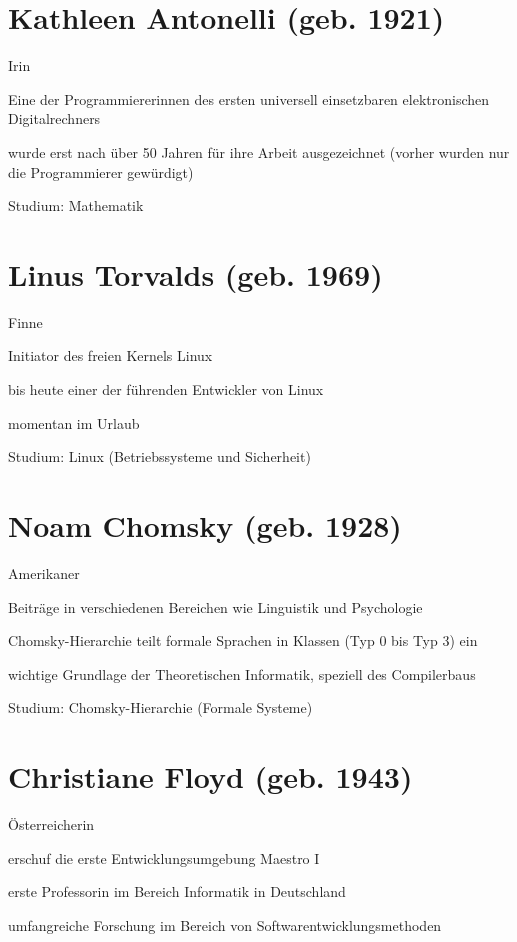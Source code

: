 \documentclass[a4paper,12pt]{report}
\begin{document}
\section*{Kathleen Antonelli (geb. 1921)}
\begin{itemize*}
    \item Irin
    \item Eine der Programmiererinnen des ersten universell einsetzbaren elektronischen Digitalrechners
    \item wurde erst nach über 50 Jahren für ihre Arbeit ausgezeichnet (vorher wurden nur die Programmierer gewürdigt)
    \item Studium: Mathematik
\end{itemize*}

\section*{Linus Torvalds (geb. 1969)}
\begin{itemize*}
    \item Finne
    \item Initiator des freien Kernels Linux
    \item bis heute einer der führenden Entwickler von Linux
    \item momentan im Urlaub
    \item Studium: Linux (Betriebssysteme und Sicherheit)
\end{itemize*}

\section*{Noam Chomsky (geb. 1928)}
\begin{itemize*}
    \item Amerikaner
    \item Beiträge in verschiedenen Bereichen wie Linguistik und Psychologie
    \item Chomsky-Hierarchie teilt formale Sprachen in Klassen (Typ 0 bis Typ 3) ein
    \item wichtige Grundlage der Theoretischen Informatik, speziell des Compilerbaus
    \item Studium: Chomsky-Hierarchie (Formale Systeme)
\end{itemize*}

\newpage

\section*{Christiane Floyd (geb. 1943)}
\begin{itemize*}
    \item Österreicherin
    \item erschuf die erste Entwicklungsumgebung Maestro I
    \item erste Professorin im Bereich Informatik in Deutschland
    \item umfangreiche Forschung im Bereich von Softwarentwicklungsmethoden
\end{itemize*}
\end{document}
